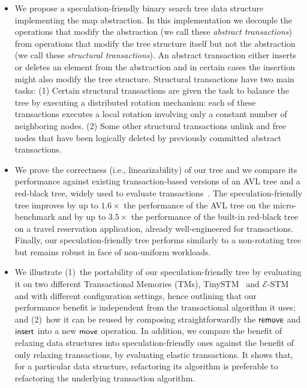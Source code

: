 \documentclass[runningheads,a4paper]{article}
\begin{document}
\begin{itemize}
\item We propose a speculation-friendly binary search tree data structure
implementing the map abstraction.
In this implementation we decouple the operations that modify the abstraction (we call these \emph{abstract transactions}) from operations
that modify the tree structure itself but not the abstraction (we call these \emph{structural transactions}).
An abstract transaction either inserts or deletes an element from the abstraction and 
in certain cases the insertion might also modify the tree structure.
Structural transactions have two main tasks:
(1) Certain structural transactions are given the task to balance the tree 
by executing a distributed rotation mechanism: each of these transactions executes a local rotation involving
only a constant number of neighboring nodes. 
(2) Some other structural transactions unlink and free nodes that have been logically deleted 
by previously committed abstract transactions.

\item We prove the correctness (i.e., linearizability) of our tree and we compare its performance against existing transaction-based versions of an AVL tree and a red-black tree,
widely used to evaluate transactions~\cite{DSS06,HLMS03,CCKO08,HK08,FFR08,YNW+08,DFGG11}.
The speculation-friendly tree improves by up to $1.6\times$ the performance of the AVL tree on the micro-benchmark and 
by up to $3.5\times$ the performance of the built-in red-black tree on a travel reservation application, already well-engineered for transactions.
Finally, our speculation-friendly tree performs similarly to a non-rotating tree but remains robust in face of non-uniform workloads.

\item We illustrate (1)~the portability of our speculation-friendly tree by evaluating it on two different Transactional Memories (TMs), TinySTM~\cite{FFR08} 
and $\mathcal{E}$-STM~\cite{FGG09} and with different configuration settings, hence outlining that our performance benefit is independent 
from the transactional algorithm it uses; and (2)~how it can be reused by composing 
straightforwardly the ${\sf remove}$ and ${\sf insert}$ into a new ${\sf move}$ operation.
In addition, we compare the benefit of relaxing data structures into speculation-friendly ones against the benefit of only relaxing transactions,
by evaluating elastic transactions.
It shows that, for a particular data structure, refactoring its algorithm is preferable to refactoring the underlying transaction algorithm.
\end{itemize}
\end{document}
